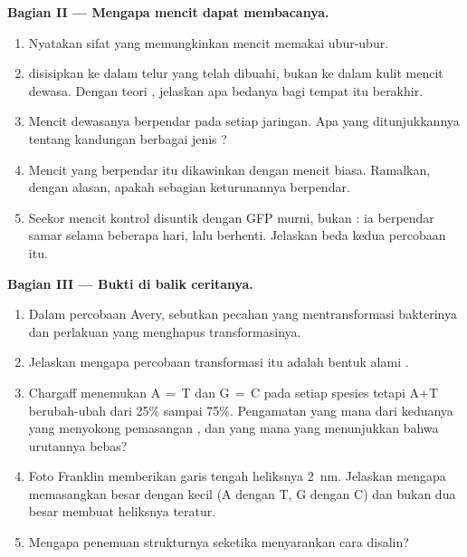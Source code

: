 \begin{problem}
\medskip
\noindent\textbf{Bagian II --- Mengapa mencit dapat membacanya.}
\begin{enumerate}[resume]
  \item Nyatakan sifat  yang memungkinkan  mencit memakai 
        ubur-ubur.
  \item {} disisipkan ke dalam  telur yang telah dibuahi, bukan
        ke dalam kulit mencit dewasa. Dengan teori , jelaskan apa
        bedanya bagi tempat  itu berakhir.
  \item Mencit dewasanya berpendar pada setiap jaringan. Apa yang
        ditunjukkannya tentang kandungan  berbagai jenis ?
  \item Mencit yang berpendar itu dikawinkan dengan mencit biasa.
        Ramalkan, dengan alasan, apakah sebagian keturunannya berpendar.
  \item Seekor mencit kontrol disuntik dengan  GFP murni, bukan
        : ia berpendar samar selama beberapa hari, lalu berhenti.
        Jelaskan beda kedua percobaan itu.
\end{enumerate}

\medskip
\noindent\textbf{Bagian III --- Bukti di balik ceritanya.}
\begin{enumerate}[resume]
  \item Dalam percobaan Avery, sebutkan pecahan yang mentransformasi
        bakterinya dan perlakuan yang menghapus transformasinya.
  \item Jelaskan mengapa percobaan transformasi itu adalah bentuk
        alami .
  \item Chargaff menemukan A$\,=\,$T dan G$\,=\,$C pada setiap spesies
        tetapi A+T berubah-ubah dari 25\% sampai 75\%. Pengamatan yang
        mana dari keduanya yang menyokong pemasangan , dan yang
        mana yang menunjukkan bahwa urutannya bebas?
  \item Foto Franklin memberikan garis tengah heliksnya \qty{2}{nm}.
        Jelaskan mengapa memasangkan  besar dengan  kecil
        (A dengan T, G dengan C) dan bukan dua  besar membuat
        heliksnya teratur.
  \item Mengapa penemuan strukturnya seketika menyarankan cara  disalin?
\end{enumerate}


\end{problem}
